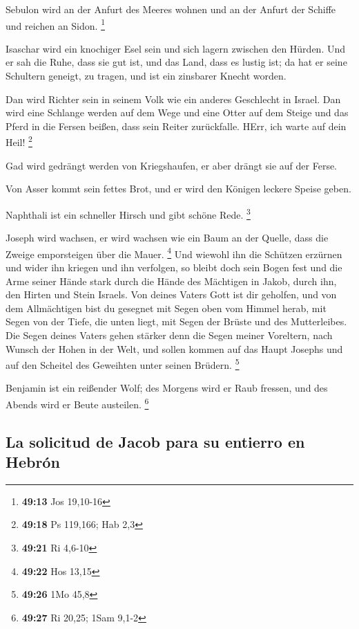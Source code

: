  Sebulon wird an der Anfurt des Meeres wohnen und an der
Anfurt der Schiffe und reichen an Sidon. \footnote{\textbf{49:13} Jos
  19,10-16}

 Isaschar wird ein knochiger Esel sein und sich lagern
zwischen den Hürden.  Und er sah die Ruhe, dass sie gut
ist, und das Land, dass es lustig ist; da hat er seine Schultern
geneigt, zu tragen, und ist ein zinsbarer Knecht worden.

 Dan wird Richter sein in seinem Volk wie ein anderes
Geschlecht in Israel.  Dan wird eine Schlange werden auf
dem Wege und eine Otter auf dem Steige und das Pferd in die Fersen
beißen, dass sein Reiter zurückfalle.  HErr, ich warte
auf dein Heil! \footnote{\textbf{49:18} Ps 119,166; Hab 2,3}

 Gad wird gedrängt werden von Kriegshaufen, er aber
drängt sie auf der Ferse.

 Von Asser kommt sein fettes Brot, und er wird den
Königen leckere Speise geben.

 Naphthali ist ein schneller Hirsch und gibt schöne Rede.
\footnote{\textbf{49:21} Ri 4,6-10}

 Joseph wird wachsen, er wird wachsen wie ein Baum an der
Quelle, dass die Zweige emporsteigen über die Mauer. \footnote{\textbf{49:22}
  Hos 13,15}  Und wiewohl ihn die Schützen erzürnen und
wider ihn kriegen und ihn verfolgen,  so bleibt doch sein
Bogen fest und die Arme seiner Hände stark durch die Hände des Mächtigen
in Jakob, durch ihn, den Hirten und Stein Israels.  Von
deines Vaters Gott ist dir geholfen, und von dem Allmächtigen bist du
gesegnet mit Segen oben vom Himmel herab, mit Segen von der Tiefe, die
unten liegt, mit Segen der Brüste und des Mutterleibes. 
Die Segen deines Vaters gehen stärker denn die Segen meiner Voreltern,
nach Wunsch der Hohen in der Welt, und sollen kommen auf das Haupt
Josephs und auf den Scheitel des Geweihten unter seinen Brüdern.
\footnote{\textbf{49:26} 1Mo 45,8}

 Benjamin ist ein reißender Wolf; des Morgens wird er
Raub fressen, und des Abends wird er Beute austeilen. \footnote{\textbf{49:27}
  Ri 20,25; 1Sam 9,1-2}

\hypertarget{la-solicitud-de-jacob-para-su-entierro-en-hebruxf3n}{%
\subsection{La solicitud de Jacob para su entierro en
Hebrón}\label{la-solicitud-de-jacob-para-su-entierro-en-hebruxf3n}}

